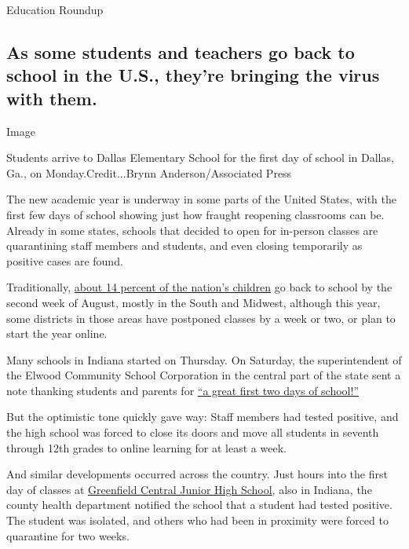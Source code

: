 Education Roundup

\hypertarget{as-some-students-and-teachers-go-back-to-school-in-the-us-theyre-bringing-the-virus-with-them}{%
\subsection{As some students and teachers go back to school in the U.S.,
they're bringing the virus with
them.}\label{as-some-students-and-teachers-go-back-to-school-in-the-us-theyre-bringing-the-virus-with-them}}

Image

Students arrive to Dallas Elementary School for the first day of school
in Dallas, Ga., on Monday.Credit...Brynn Anderson/Associated Press

The new academic year is underway in some parts of the United States,
with the first few days of school showing just how fraught reopening
classrooms can be. Already in some states, schools that decided to open
for in-person classes are quarantining staff members and students, and
even closing temporarily as positive cases are found.

Traditionally,
\href{https://www.pewresearch.org/fact-tank/2019/08/14/back-to-school-dates-u-s/}{about
14 percent of the nation's children} go back to school by the second
week of August, mostly in the South and Midwest, although this year,
some districts in those areas have postponed classes by a week or two,
or plan to start the year online.

Many schools in Indiana started on Thursday. On Saturday, the
superintendent of the Elwood Community School Corporation in the central
part of the state sent a note thanking students and parents for
\href{https://www.facebookcorewwwi.onion/ElwoodCommunitySchools/photos/pcb.1875944365880857/1875944205880873/?type=3\&theater}{``a
great first two days of school!''}

But the optimistic tone quickly gave way: Staff members had tested
positive, and the high school was forced to close its doors and move all
students in seventh through 12th grades to online learning for at least
a week.

And similar developments occurred across the country. Just hours into
the first day of classes at
\href{https://www.nytimes3xbfgragh.onion/2020/08/01/us/schools-reopening-indiana-coronavirus.html}{Greenfield
Central Junior High School}, also in Indiana, the county health
department notified the school that a student had tested positive. The
student was isolated, and others who had been in proximity were forced
to quarantine for two weeks.

